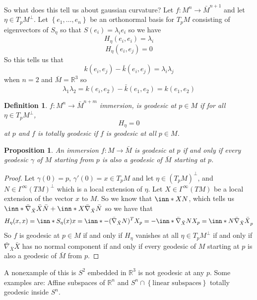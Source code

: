 \documentclass[a4paper]{article}
\newtheorem*{prop}{Proposition}
\newtheorem*{defn}{Definition}
\begin{document}
So what does this tell us about gaussian curvature? Let $f: M^n \rightarrow \bar{M}^{n+1}$ and let $\eta \in T_pM^\perp$. Let $\left\{ e_1, \dots, e_n \right\}$ be an orthonormal basis for $T_pM$ consisting of eigenvectors of $S_\eta$ so that $S(e_i) = \lambda_i e_i$ so we have
\[
  H_\eta (e_i, e_i) = \lambda_i
\]
\[
  H_\eta (e_i, e_j) = 0
\]
So this tells us that
\[
  k(e_i, e_j) - \bar{k}(e_i,e_j) = \lambda_i \lambda_j
\]
when $n =2$ and $\bar{M} = \mathds{R}^3$ so
\[
  \lambda_1 \lambda_2 = k(e_i, e_2) - \bar{k}(e_1, e_2) = k(e_1, e_2)
\]

\begin{defn}
  $f: M^n \rightarrow \bar{M}^{n+m}$ immersion, is geodesic at $p \in M$ if for all $\eta \in T_pM^\perp$,
  \[
    H_\eta = 0
  \]
  at $p$ and $f$ is totally geodesic if $f$ is geodesic at all $p \in M$.
\end{defn}

\begin{prop}
  An immersion $f:M \rightarrow \bar{M}$ is geodesic at $p$ if and only if every geodesic $\gamma$ of $M$ starting from $p$ is also a geodesic of $\bar{M}$ starting at $p$.
\end{prop}

\begin{proof}
  Let $\gamma(0) = p$, $\gamma'(0) = x \in T_pM$ and let $\eta \in \left( T_pM \right)^\perp$, and $N \in \Gamma^\infty(TM)^\perp$ which is a local extension of $\eta$. Let $X \in \Gamma^\infty(TM)$ be a local extension of the vector $x$ to $M$. So we know that $\inn*{X}{N}$, which tells us $\inn*{\bar{\nabla}_{\bar{X}} \bar{X}}{\bar{N}} + \inn*{X}{\bar{\nabla}_{\bar{X}} \bar{N}}$ so we have that
  \[
    H_\eta(x,x) = \inn*{S_\eta (x)}{x} = \inn*{-(\bar{\nabla}_{\bar{X}} N)^T}{X}_p = - \inn*{\bar{\nabla}_{\bar{X}}N}{X}_p = \inn*{N}{\bar{\nabla}_{\bar{X}} \bar{X}}_p
  \]
  So $f$ is geodesic at $p \in M$ if and only if $H_\eta$ vanishes at all $\eta \in T_pM^\perp$ if and only if $\bar{\nabla}_{\bar{X}} \bar{X}$ has no normal component if and only if every geodesic of $M$ starting at $p$ is also a geodesic of $\bar{M}$ from $p$.
\end{proof}
A nonexample of this is $S^2$ embedded in $\mathds{R}^3$ is not geodesic at any $p$. Some examples are: Affine subspaces of $\mathds{R}^n$ and $S^n \cap \left\{ \text{linear subspaces} \right\}$ totally geodesic inside $S^n$. 
\end{document}
